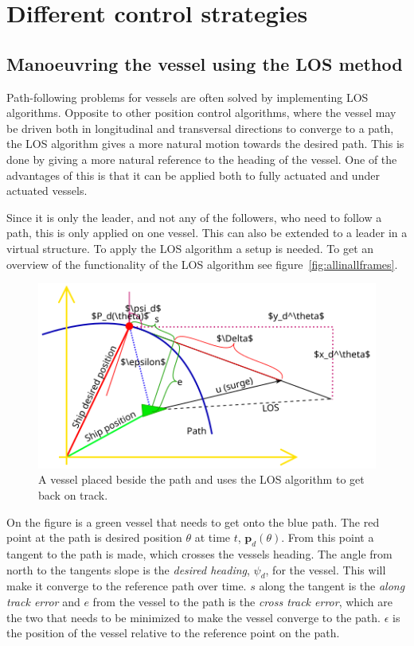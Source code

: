 \chapter{Different control strategies}

\section{Manoeuvring the vessel using the LOS method}
Path-following problems for vessels are often solved by implementing \ac{LOS} algorithms. Opposite to other position control algorithms, where the vessel may be driven both in longitudinal and transversal directions to converge to a path, the \ac{LOS} algorithm gives a more natural motion towards the desired path. This is done by giving a more natural reference to the heading of the vessel. One of the advantages of this is that it can be applied both to fully actuated and under actuated vessels.

Since it is only the leader, and not any of the followers, who need to follow a path, this is only applied on one vessel. This can also be extended to a leader in a virtual structure. To apply the \ac{LOS} algorithm a setup is needed. To get an overview of the functionality of the \ac{LOS} algorithm see figure~\vref{fig:allinallframes}.
\begin{figure}[htbp]
	\centering
	\includegraphics[width=\textwidth]{fig/allinallframes}
	\caption{A vessel placed beside the path and uses the \ac{LOS} algorithm to get back on track.}
	\label{fig:allinallframes}
\end{figure}
On the figure is a green vessel that needs to get onto the blue path. The red point at the path is desired position $\theta$ at time $t$, $\textbf{p}_d(\theta)$. From this point a tangent to the path is made, which crosses the vessels heading. The angle from north to the tangents slope is the \textit{desired heading}, $\psi_d$, for the vessel. This will make it converge to the reference path over time. $s$ along the tangent is the \textit{along track error} and $e$ from the vessel to the path is the \textit{cross track error}, which are  the two that needs to be minimized to make the vessel converge to the path. $\epsilon$ is the position of the vessel relative to the reference point on the path.

